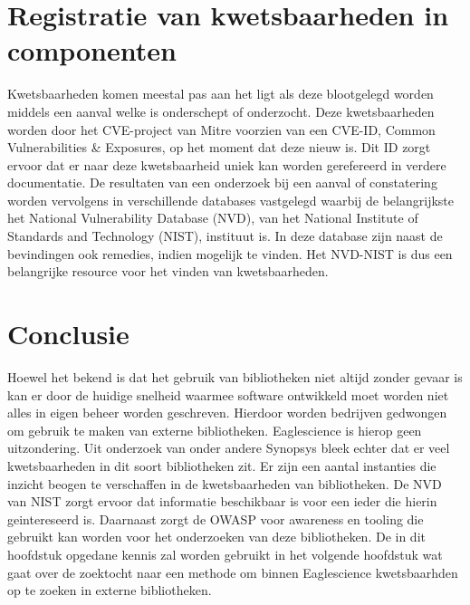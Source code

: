 \section{Registratie van kwetsbaarheden in componenten}\label{sec:registratie-van-kwetsbaarheden-in-bibliotheken}
Kwetsbaarheden komen meestal pas aan het ligt als deze blootgelegd worden middels een aanval welke is onderschept of onderzocht. Deze kwetsbaarheden worden door het CVE-project van Mitre voorzien van een CVE-ID, Common Vulnerabilities & Exposures, op het moment dat deze nieuw is. Dit ID zorgt ervoor dat er naar deze kwetsbaarheid uniek kan worden gerefereerd in verdere documentatie. De resultaten van een onderzoek bij een aanval of constatering worden vervolgens in verschillende databases vastgelegd waarbij de belangrijkste het National Vulnerability Database (NVD), van het National Institute of Standards and Technology (NIST), instituut is.
In deze database zijn naast de bevindingen ook remedies, indien mogelijk te vinden. Het NVD-NIST is dus een belangrijke resource voor het vinden van kwetsbaarheden.


\section{Conclusie}\label{sec:soupTheorieconclusie}
Hoewel het bekend is dat het gebruik van bibliotheken niet altijd zonder gevaar is kan er door de huidige snelheid waarmee software ontwikkeld moet worden niet alles in eigen beheer worden geschreven. Hierdoor worden bedrijven gedwongen om gebruik te maken van externe bibliotheken. Eaglescience is hierop geen uitzondering. Uit onderzoek van onder andere Synopsys bleek echter dat er veel kwetsbaarheden in dit soort bibliotheken zit. Er zijn een aantal instanties die inzicht beogen te verschaffen in de kwetsbaarheden van bibliotheken. De NVD van NIST zorgt ervoor dat informatie beschikbaar is voor een ieder die hierin geintereseerd is. Daarnaast zorgt de OWASP voor awareness en tooling die gebruikt kan worden voor het onderzoeken van deze bibliotheken. De in dit hoofdstuk opgedane kennis zal worden gebruikt in het volgende hoofdstuk wat gaat over de zoektocht naar een methode om binnen Eaglescience kwetsbaarhden op te zoeken in externe bibliotheken.
